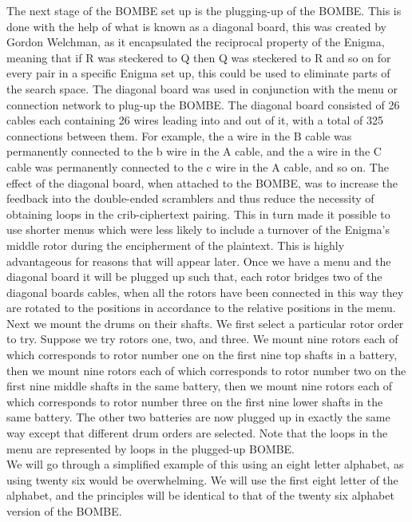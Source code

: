 \documentclass[12pt,a4paper]{article}
\begin{document}
The next stage of the BOMBE set up is the plugging-up of the BOMBE. This is done with the help of what is known as a diagonal board, this was created by Gordon Welchman, as it encapsulated the reciprocal property of the Enigma, meaning that if R was steckered to Q then Q was steckered to R and so on for every pair in a specific Enigma set up, this could be used to eliminate parts of the search space. The diagonal board was used in conjunction with the menu or connection network to plug-up the BOMBE. The diagonal board consisted of 26 cables each containing 26 wires leading into and out of it, with a total of 325 connections between them. For example, the a wire in the B cable was permanently connected to the b wire in the A cable, and the a wire in the C cable was permanently connected to the c wire in the A cable, and so on. The effect of the diagonal board, when attached to the BOMBE, was to increase the feedback into the double-ended scramblers and thus reduce the necessity of obtaining loops in the crib-ciphertext pairing. This in turn made it possible to use shorter menus which were less likely to include a turnover of the Enigma's middle rotor during the encipherment of the plaintext. This is highly advantageous for reasons that will appear later. Once we have a menu and the diagonal board it will be plugged up such that, each rotor bridges two of the diagonal boards cables, when all the rotors have been connected in this way they are rotated to the positions in accordance to the relative positions in the menu. Next we mount the drums on their shafts. We first select a particular rotor order to try. Suppose we try rotors one, two, and three. We mount nine rotors each of which corresponds to rotor number one on the first nine top shafts in a battery, then we mount nine rotors each of which corresponds to rotor number two on the first nine middle shafts in the same battery, then we mount nine rotors each of which corresponds to rotor number three on the first nine lower shafts in the same battery. The other two batteries are now plugged up in exactly the same way except that different drum orders are selected. Note that the loops in the menu are represented by loops in the plugged-up BOMBE.\\

We will go through a simplified example of this using an eight letter alphabet, as using twenty six would be overwhelming. We will use the first eight letter of the alphabet, and the principles will be identical to that of the twenty six alphabet version of the BOMBE.
\end{document}
